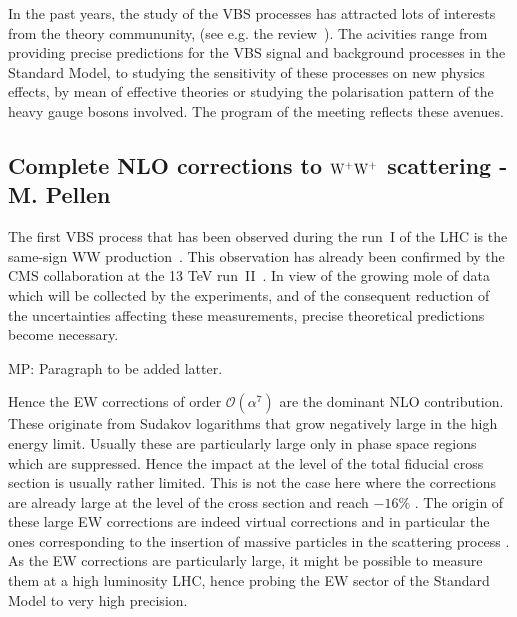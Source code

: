 \newcommand{\MP}[1]{{ {\color{blue}{ [MP: #1]}} }}

In the past years, the study of the VBS processes has attracted lots of interests from the theory commununity, (see e.g. the review~\cite{Rauch:2016pai}).
The acivities range from providing precise predictions for the VBS signal and background processes in the Standard Model, to studying the sensitivity of these 
processes on new physics effects, by mean of effective theories or studying the polarisation pattern of the heavy 
gauge bosons involved.
The program of the meeting reflects these avenues.

\subsection{Complete NLO corrections to ${\rm W^+ W^+}$ scattering - M. Pellen}

The first VBS process that has been observed during the run~I of the LHC is the same-sign WW production~\cite{Aad:2014zda,Aaboud:2016ffv,Khachatryan:2014sta}.
This observation has already been confirmed by the CMS collaboration at the 13 TeV run~II~\cite{CMS:2017adb}.
In view of the growing mole of data which will be collected by the experiments, and of the consequent reduction of the uncertainties affecting these measurements, 
precise theoretical predictions become necessary.

MP: Paragraph to be added latter.

Hence the EW corrections of order $\mathcal{O}\left(\alpha^7\right)$ are the dominant NLO contribution.
These originate from Sudakov logarithms that grow negatively large in the high energy limit.
Usually these are particularly large only in phase space regions which are suppressed.
Hence the impact at the level of the total fiducial cross section is usually rather limited.
This is not the case here where the corrections are already large at the level of the cross section and reach $-16\%$ \cite{Biedermann:2016yds}.
The origin of these large EW corrections are indeed virtual corrections and in particular the ones corresponding to the insertion of massive particles in the scattering process \cite{Biedermann:2016yds}.
As the EW corrections are particularly large, it might be possible to measure them at a high luminosity LHC, hence probing the EW sector of the Standard Model to very high precision.

